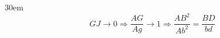 \documentclass[border=4pt]{standalone}
\begin{document}
\begin{varwidth}{30em}
\large
\[ GJ\to 0 \Rightarrow \frac{AG}{Ag}\to 1 \Rightarrow \frac{AB^{2}}{Ab^{2}}=\frac{BD}{bd} \]

\end{varwidth}
\end{document}
